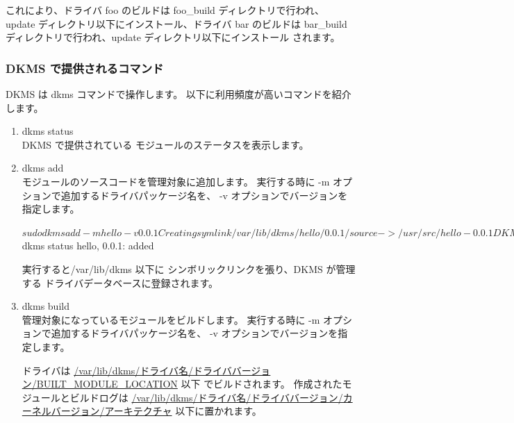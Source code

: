 \documentclass[mingoth,a4paper]{jsarticle}
\begin{document}
これにより、ドライバ foo のビルドは foo\_build ディレクトリで行われ、
update ディレクトリ以下にインストール、ドライバ bar のビルドは
bar\_build ディレクトリで行われ、update ディレクトリ以下にインストール
されます。

\subsubsection{DKMS で提供されるコマンド}
DKMS は dkms コマンドで操作します。
以下に利用頻度が高いコマンドを紹介します。

\begin{enumerate}
\item dkms status\\
DKMS で提供されている モジュールのステータスを表示します。

\item dkms add \\
モジュールのソースコードを管理対象に追加します。
実行する時に -m オプションで追加するドライバパッケージ名を、
-v オプションでバージョンを指定します。

\begin{commandline}
$ sudo dkms add -m hello -v 0.0.1

Creating symlink /var/lib/dkms/hello/0.0.1/source ->
                 /usr/src/hello-0.0.1

DKMS: add completed.
$ dkms status
hello, 0.0.1: added
\end{commandline}

実行すると/var/lib/dkms 以下に シンボリックリンクを張り、DKMS が管理する
ドライバデータベースに登録されます。

\item dkms build \\
管理対象になっているモジュールをビルドします。
実行する時に -m オプションで追加するドライバパッケージ名を、
-v オプションでバージョンを指定します。

ドライバは \url{/var/lib/dkms/ドライバ名/ドライババージョン/BUILT\_MODULE\_LOCATION} 以下
でビルドされます。
作成されたモジュールとビルドログは
\url{/var/lib/dkms/ドライバ名/ドライババージョン/カーネルバージョン/アーキテクチャ}
以下に置かれます。


\end{enumerate}
\end{document}
